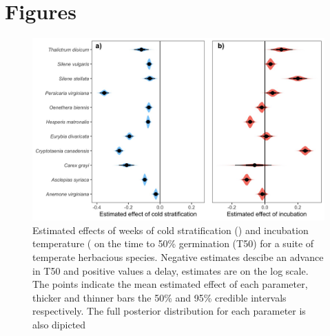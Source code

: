 \documentclass{article}\usepackage[]{graphicx}\usepackage[]{color}
\begin{document}


\section*{Figures}
\begin{figure}[h!]
    \centering
\includegraphics[width=\textwidth]{..//figure/mus_survival.jpeg}
   \caption{Estimated effects of weeks of cold stratification () and incubation temperature ( on the time to 50\% germination (T50) for a suite of temperate herbacious species. Negative estimates descibe an advance in T50 and positive values a delay, estimates are on the log scale. The points indicate the mean estimated effect of each parameter, thicker  and thinner bars the 50\% and 95\% credible intervals respectively. The full posterior distribution for each parameter is also dipicted  } 
   \label{fig:musurv}
\end{figure}
\end{document}
